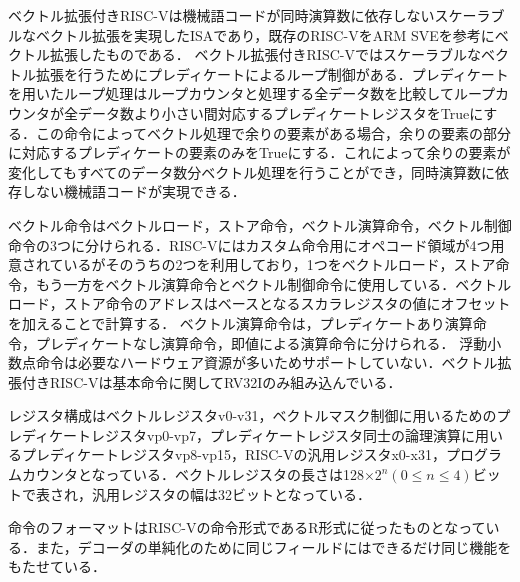 
ベクトル拡張付きRISC-Vは機械語コードが同時演算数に依存しないスケーラブルなベクトル拡張を実現したISAであり，既存のRISC-VをARM SVEを参考にベクトル拡張したものである．
ベクトル拡張付きRISC-Vではスケーラブルなベクトル拡張を行うためにプレディケートによるループ制御がある．プレディケートを用いたループ処理はループカウンタと処理する全データ数を比較してループカウンタが全データ数より小さい間対応するプレディケートレジスタをTrueにする．この命令によってベクトル処理で余りの要素がある場合，余りの要素の部分に対応するプレディケートの要素のみをTrueにする．これによって余りの要素が変化してもすべてのデータ数分ベクトル処理を行うことができ，同時演算数に依存しない機械語コードが実現できる．

ベクトル命令はベクトルロード，ストア命令，ベクトル演算命令，ベクトル制御命令の3つに分けられる．RISC-Vにはカスタム命令用にオペコード領域が4つ用意されているがそのうちの2つを利用しており，1つをベクトルロード，ストア命令，もう一方をベクトル演算命令とベクトル制御命令に使用している．ベクトルロード，ストア命令のアドレスはベースとなるスカラレジスタの値にオフセットを加えることで計算する．
ベクトル演算命令は，プレディケートあり演算命令，プレディケートなし演算命令，即値による演算命令に分けられる．
浮動小数点命令は必要なハードウェア資源が多いためサポートしていない．ベクトル拡張付きRISC-Vは基本命令に関してRV32Iのみ組み込んでいる．

レジスタ構成はベクトルレジスタv0-v31，ベクトルマスク制御に用いるためのプレディケートレジスタvp0-vp7，プレディケートレジスタ同士の論理演算に用いるプレディケートレジスタvp8-vp15，RISC-Vの汎用レジスタx0-x31，プログラムカウンタとなっている．ベクトルレジスタの長さは128$\times 2^n(0\leq n\leq 4)$ビットで表され，汎用レジスタの幅は32ビットとなっている．

命令のフォーマットはRISC-Vの命令形式であるR形式に従ったものとなっている．また，デコーダの単純化のために同じフィールドにはできるだけ同じ機能をもたせている．


